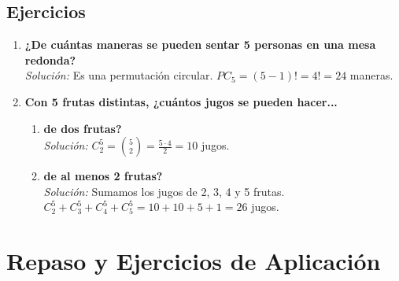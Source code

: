 \documentclass[12pt, letterpaper]{article}
\begin{document}
\subsection{Ejercicios}
\begin{enumerate}
	\item \textbf{¿De cuántas maneras se pueden sentar 5 personas en una mesa redonda?} \\
	      \textit{Solución:} Es una permutación circular. $PC_5 = (5-1)! = 4! = 24$ maneras.

	\item \textbf{Con 5 frutas distintas, ¿cuántos jugos se pueden hacer...}
	      \begin{enumerate}
		      \item \textbf{de dos frutas?} \\
		            \textit{Solución:} $C_2^5 = \binom{5}{2} = \frac{5 \cdot 4}{2} = 10$ jugos.
		      \item \textbf{de al menos 2 frutas?} \\
		            \textit{Solución:} Sumamos los jugos de 2, 3, 4 y 5 frutas. \\
		            $C_2^5 + C_3^5 + C_4^5 + C_5^5 = 10 + 10 + 5 + 1 = 26$ jugos.
	      \end{enumerate}
\end{enumerate}
\newpage

\section{Repaso y Ejercicios de Aplicación}
\end{document}
